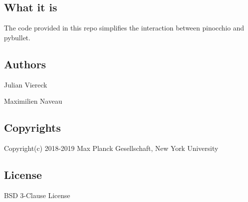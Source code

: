 \subsection*{What it is}

The code provided in this repo simplifies the interaction between pinocchio and pybullet.

\subsection*{Authors}


\begin{DoxyItemize}
\item Julian Viereck
\item Maximilien Naveau
\end{DoxyItemize}

\subsection*{Copyrights}

Copyright(c) 2018-\/2019 Max Planck Gesellschaft, New York University

\subsection*{License}

B\+SD 3-\/\+Clause License 